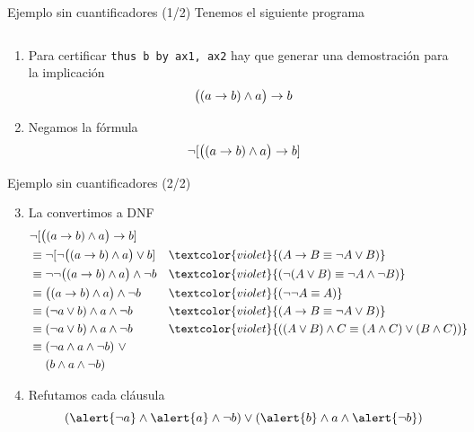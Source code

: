 \documentclass[xcolor={dvipsnames},spanish]{beamer}
\newcommand{\just}[1]{\textcolor{violet}{(#1)}}
\begin{document}
\begin{frame}{Ejemplo sin cuantificadores (1/2)}
    Tenemos el siguiente programa

    \begin{figure}[H]
        \centering
        \begin{tabular}{c}
            
        \end{tabular}
    \end{figure}
    \begin{enumerate}
        \item Para certificar \lstinline{thus b by ax1, ax2} hay que generar una
        demostración para la implicación \[\big((a \to b) \wedge a \big)\to b\]
        \item Negamos la fórmula 
        \[ \neg [ \big( (a \to b) \wedge a \big) \to b ] \]
    \end{enumerate}
\end{frame}
\begin{frame}{Ejemplo sin cuantificadores (2/2)}
    \begin{enumerate}
        \setcounter{enumi}{2}
        \item La convertimos a DNF
        \begin{align*}
            &\fNot [ \big( (a \to b) \fAnd a \big) \to b ] \\
            &\equiv \fNot [ \fNot \big( (a \to b) \fAnd a \big) \fOr b ]
                && \just{\form \to \formTwo \equiv \fNot \form \fOr \formTwo}\\
            &\equiv \fNot \fNot \big( (a \to b) \fAnd a \big) \fAnd \fNot b
                && \just{\fNot(\form \fOr \formTwo) \equiv \fNot \form \fAnd \fNot \formTwo}\\
            &\equiv \big( (a \to b) \fAnd a \big) \fAnd \fNot b
                && \just{\fNot\fNot \form \equiv \form}\\
            &\equiv (\fNot a \fOr b) \fAnd a \fAnd \fNot b
                 && \just{\form \to \formTwo \equiv \fNot \form \fOr \formTwo}\\
            &\equiv (\fNot a \fOr b) \fAnd a \fAnd \fNot b
                && \just{(\form \fOr \formTwo) \fAnd \formThree \equiv (\form \fAnd \formThree) \fOr (\formTwo \fAnd \formThree)}\\
            &\equiv \begin{aligned}[t]
                &(\fNot a \fAnd a \fAnd \fNot b)\ \vee\\
                &(b \fAnd a \fAnd \fNot b)
            \end{aligned}
        \end{align*}
        \item Refutamos cada cláusula
        \[
            (\alert{\fNot a} \fAnd \alert{a} \fAnd \fNot b) \vee
            (\alert{b} \fAnd a \fAnd \alert{\fNot b})
        \]
    \end{enumerate}
\end{frame}
\end{document}
